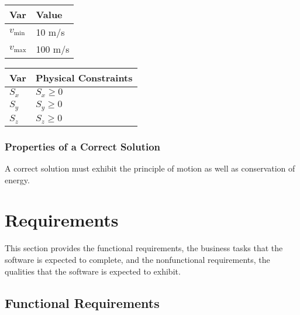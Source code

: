 \documentclass[12pt]{article}
\begin{document}
\noindent 

\begin{table}[!h]
\caption{Specification Parameter Values} \label{TblSpecParams}
\renewcommand{\arraystretch}{1.2}
\noindent \begin{longtable*}{l l} 
  \toprule
  \textbf{Var} & \textbf{Value} \\
  \midrule 
  $v_\text{min}$ & 10 m/s\\
  $v_\text{max}$ & 100 m/s\\
  \bottomrule
\end{longtable*}
\end{table}

\begin{table}[!h]
\caption{Output Variables} \label{TblOutputVar}
\renewcommand{\arraystretch}{1.2}
\noindent \begin{longtable*}{l l} 
  \toprule
  \textbf{Var} & \textbf{Physical Constraints} \\
  \midrule 
  $S_{x}$ & $S_{x} \geq 0$
  \\
  $S_{y}$ & $S_{y} \geq 0$
  \\
  $S_{z}$ & $S_{z} \geq 0$
  \\
  \bottomrule
\end{longtable*}
\end{table}

\subsubsection{Properties of a Correct Solution} \label{sec_CorrectSolution}

\noindent
A correct solution must exhibit the principle of motion as well as conservation of energy.

\section{Requirements}

This section provides the functional requirements, the business tasks that the
software is expected to complete, and the nonfunctional requirements, the
qualities that the software is expected to exhibit.

\subsection{Functional Requirements}
\end{document}
